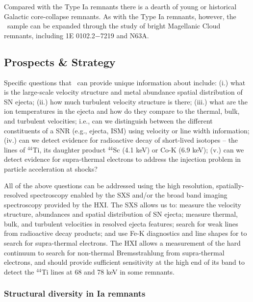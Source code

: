 \documentclass[11pt,a4paper]{article}
\begin{document}
{Compared with the Type Ia remnants there is a dearth of young or
historical Galactic core-collapse remnants.  As with the Type Ia
remnants, however, the \ah\ sample can be expanded through the
study of bright Magellanic Cloud remnants, including 1E 0102.2$-$7219
and N63A.

\subsection{Prospects \& Strategy}

Specific questions that \ah\ can provide unique information about
include: (i.) what is the large-scale velocity structure and metal
abundance spatial distribution of SN ejecta; (ii.) how much turbulent
velocity structure is there; (iii.) what are the ion temperatures in
the ejecta and how do they compare to the thermal, bulk, and turbulent
velocities; i.e., can we distinguish between the different
constituents of a SNR (e.g., ejecta, ISM) using velocity or line width
information; (iv.) can we detect evidence for radioactive decay of
short-lived isotopes – the lines of $^{44}$Ti, its daughter product
$^{44}$Sc (4.1 keV) or Co-K (6.9 keV); (v.) can we detect evidence for
supra-thermal electrons to address the injection problem in particle
acceleration at shocks?

All of the above questions can be addressed using the high resolution,
spatially-resolved spectroscopy enabled by the SXS and/or the broad
band imaging spectroscopy provided by the HXI.  The SXS allows us to:
measure the velocity structure, abundances and spatial distribution of
SN ejecta; measure thermal, bulk, and turbulent velocities in resolved
ejecta features; search for weak lines from radioactive decay
products; and use Fe-K diagnostics and line shapes for to search for
supra-thermal electrons.  The HXI allows a measurement of the hard
continuum to search for non-thermal Bremsstrahlung from supra-thermal
electrons, and should provide sufficient sensitivity at the high end
of its band to detect the $^{44}$Ti lines at 68 and 78 keV in some
remnants.

\subsubsection{Structural diversity in Ia remnants}

}
\end{document}
